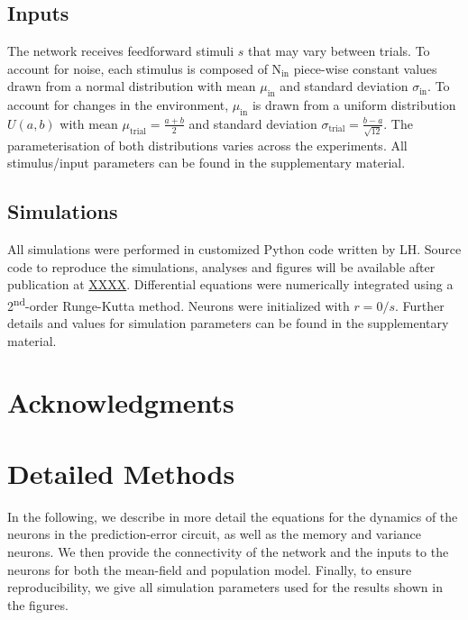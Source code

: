 \documentclass[10pt,a4paper,draft]{article}
\begin{document}
\subsection*{Inputs}
%
The network receives feedforward stimuli $s$ that may vary between trials. To account for noise, each stimulus is composed of N$_\mathrm{in}$ piece-wise constant values drawn from a normal distribution with mean $\mu_\mathrm{in}$ and standard deviation $\sigma_\mathrm{in}$. To account for changes in the environment, $\mu_\mathrm{in}$ is drawn from a uniform distribution $U(a,b)$ with mean $\mu_\mathrm{trial} = \frac{a+b}{2}$ and standard deviation $\sigma_\mathrm{trial} = \frac{b-a}{\sqrt{12}}$. The parameterisation of both distributions varies across the experiments. All stimulus/input parameters can be found in the supplementary material.

\subsection*{Simulations}
%
All simulations were performed in customized Python code written by LH. Source code to reproduce the simulations, analyses and figures will be available after publication at \url{XXXX}. Differential equations were numerically integrated using a 2\textsuperscript{nd}-order Runge-Kutta method. Neurons were initialized with $r=0/s$. Further details and values for simulation parameters can be found in the supplementary material.


\section*{Acknowledgments}
%







\clearpage
\appendix


\tableofcontents
\section{Detailed Methods}
%
In the following, we describe in more detail the equations for the dynamics of the neurons in the prediction-error circuit, as well as the memory and variance neurons. We then provide the connectivity of the network and the inputs to the neurons for both the mean-field and population model. Finally, to ensure reproducibility, we give all simulation parameters used for the results shown in the figures.  
\end{document}
